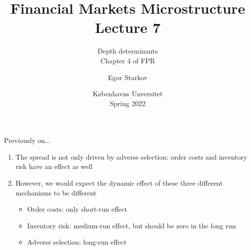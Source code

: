 \documentclass[english,10pt
,aspectratio=169
]{beamer}
\title{Financial Markets Microstructure \\ Lecture 7}
\subtitle{Depth determinants \\ %
	Chapter 4 of FPR}
\author{Egor Starkov}
\date{K{\o}benhavns Unversitet \\
	Spring 2022}
\begin{document}
	

\frame[plain]{\titlepage}


\begin{frame}{Previously on...}
	\begin{enumerate}
		\item The spread is not only driven by adverse selection: order costs and inventory risk have an effect as well
		\item However, we would expect the dynamic effect of these three different mechanisms to be different
		\begin{itemize}
			\item Order costs: only short-run effect 
			\item Inventory risk: medium-run effect, but should be zero in the long run
			\item Adverse selection: long-run effect 
		\end{itemize}
	\end{enumerate}
\end{frame}


\end{document}
